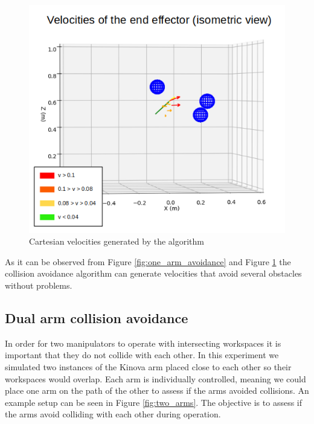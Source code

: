 \documentclass[a4paper, 11.5pt, conference]{ieeeconf}      %
\begin{document}
\begin{figure}[H]
	\includegraphics[scale=0.30]{images/one_arm_three_obstacles_side_vector.png}
	\caption{Cartesian velocities generated by the algorithm}
	\label{fig:one_arm_avoidance_vector}
\end{figure}

As it can be observed from Figure \ref{fig:one_arm_avoidance} and Figure \ref{fig:one_arm_avoidance_vector} the collision avoidance algorithm can generate velocities that avoid several obstacles without problems. 

\subsection{Dual arm collision avoidance} %

In order for two manipulators to operate with intersecting workspaces it is important that they do not collide with each other. In this experiment we simulated two instances of the Kinova arm placed close to each other so their workspaces would overlap. Each arm is individually controlled, meaning we could place one arm on the path of the other to assess if the arms avoided collisions. An example setup can be seen in Figure \ref{fig:two_arms}. The objective is to assess if the arms avoid colliding with each other during operation.
\end{document}
